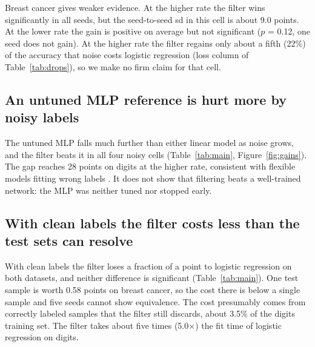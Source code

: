 Breast cancer gives weaker evidence. At the higher rate the filter wins significantly in all seeds, but the seed-to-seed sd in this cell is about 9.0 points. At the lower rate the gain is positive on average but not significant ($p$ = 0.12, one seed does not gain). At the higher rate the filter regains only about a fifth (22\%) of the accuracy that noise costs logistic regression (loss column of Table~\ref{tab:drops}), so we make no firm claim for that cell.

\subsection{An untuned MLP reference is hurt more by noisy labels}

The untuned MLP falls much further than either linear model as noise grows, and the filter beats it in all four noisy cells (Table~\ref{tab:main}, Figure~\ref{fig:gains}). The gap reaches 28 points on digits at the higher rate, consistent with flexible models fitting wrong labels \citep{zhang2021understanding}. It does not show that filtering beats a well-trained network: the MLP was neither tuned nor stopped early.

\subsection{With clean labels the filter costs less than the test sets can resolve}

With clean labels the filter loses a fraction of a point to logistic regression on both datasets, and neither difference is significant (Table~\ref{tab:main}). One test sample is worth 0.58 points on breast cancer, so the cost there is below a single sample and five seeds cannot show equivalence. The cost presumably comes from correctly labeled samples that the filter still discards, about 3.5\% of the digits training set. The filter takes about five times (5.0$\times$) the fit time of logistic regression on digits.
